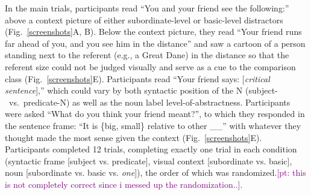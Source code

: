 \documentclass[10pt,letterpaper]{article}
\newcommand{\pt}[1]{\textcolor{Purple}{[pt: #1]}}
\begin{document}
In the main trials, participants read “You and your friend see the following:” above a context picture of either subordinate-level or basic-level distractors (Fig.~\ref{screenshots}A, B). 
Below the context picture, they read “Your friend runs far ahead of you, and you see him in the distance” and saw a cartoon of a person standing next to the referent (e.g., a Great Dane) in the distance so that the referent size could not be judged visually and serve as a cue to the comparison class (Fig.~\ref{screenshots}E). 
Participants read ``Your friend says: [\emph{critical sentence}],'' which could vary by both syntactic position of the N (subject-~vs.~predicate-N) as well as the noun label level-of-abstractness. 
Participants were asked “What do you think your friend meant?”, to which they responded in the sentence frame: “It is \{big, small\} relative to other \_\_” with whatever they thought made the most sense given the context (Fig.~\ref{screenshots}E).
Participants completed 12 trials, completing exactly one trial in each condition (syntactic frame [subject vs. predicate], visual context [subordinate vs. basic], noun [subordinate vs. basic vs. \emph{one}]), the order of which was randomized.\pt{this is not completely correct since i messed up the randomization..}.

\end{document}
